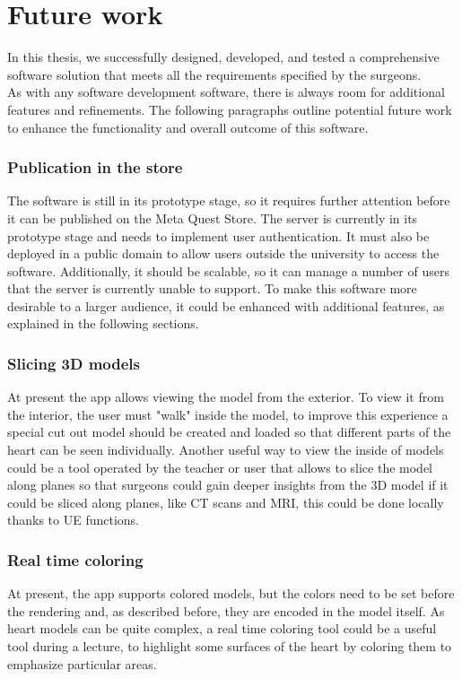 
\chapter{Future work}
\label{chp:conclusions}
\noindent
In this thesis, we successfully designed, developed, and tested a comprehensive software solution that meets all the requirements specified by the surgeons.\\
As with any software development software, there is always room for additional features and refinements. The following paragraphs outline potential future work to enhance the functionality and overall outcome of this software.

\subsection{Publication in the store}
\noindent
The software is still in its prototype stage, so it requires further attention before it can be published on the Meta Quest Store.
The server is currently in its prototype stage and needs to implement user authentication. It must also be deployed in a public domain to allow users outside the university to access the software.
Additionally, it should be scalable, so it can manage a number of users that the server is currently unable to support.
To make this software more desirable to a larger audience, it could be enhanced with additional features, as explained in the following sections.

\subsection{Slicing 3D models}
\noindent
At present the app allows viewing the model from the exterior.
To view it from the interior, the user must "walk" inside the model, to improve this experience a special cut out model should be created and loaded so that different parts of the heart can be seen individually.
Another useful way to view the inside of models could be a tool operated by the teacher or user that allows to slice the model along planes so that surgeons could gain deeper insights from the 3D model if it could be sliced along planes, like \ac{CT} scans and \ac{MRI}, this could be done locally thanks to \ac{UE} functions.

\subsection{Real time coloring}
\noindent
At present, the app supports colored models, but the colors need to be set before the rendering and, as described before, they are encoded in the model itself.
As heart models can be quite complex, a real time coloring tool could be a useful tool during a lecture, to highlight some surfaces of the heart by coloring them to emphasize particular areas.

